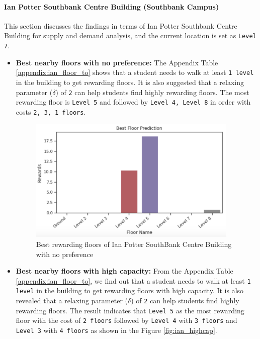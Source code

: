 \paragraph{Ian Potter Southbank Centre Building (Southbank Campus)}
This section discusses the findings in terms of Ian Potter Southbank Centre Building for supply and demand analysis, and the current location is set as \texttt{Level 7}.
\begin{itemize}
    \item \textbf{Best nearby floors with no preference:}
    The Appendix Table \ref{appendix:ian_floor_to} shows that a student needs to walk at least \texttt{1 level} in the building to get rewarding floors. It is also suggested that a relaxing parameter ($\delta$) of \texttt{2} can help students find highly rewarding floors. The most rewarding floor is \texttt{Level 5} and followed by \texttt{Level 4, Level 8} in order with costs \texttt{2, 3, 1 floors}.
    
    \begin{figure}[H]
    \centering
    \includegraphics[width=10cm,keepaspectratio=true]{resources/images/floor_to/ian_no.png}
    \caption{Best rewarding floors of Ian Potter SouthBank Centre Building with no preference}
    \label{fig:ian_no}
    \end{figure}
    
    \item \textbf{Best nearby floors with high capacity:} From the Appendix Table \ref{appendix:ian_floor_to}, we find out that a student needs to walk at least \texttt{1 level} in the building to get rewarding floors with high capacity. It is also revealed that a relaxing parameter ($\delta$) of \texttt{2} can help students find highly rewarding floors. The result indicates that \texttt{Level 5} as the most rewarding floor with the cost of \texttt{2 floors} followed by \texttt{Level 4} with \texttt{3 floors} and \texttt{Level 3} with \texttt{4 floors} as shown in the Figure \ref{fig:ian_highcap}.
    

\end{itemize}
